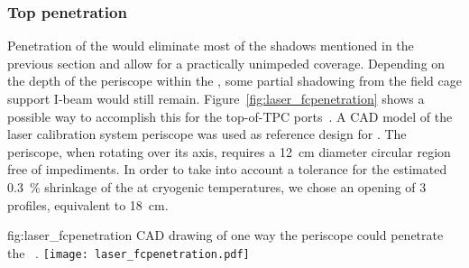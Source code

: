 \subsubsection{Top  penetration}
\label{sec:lasertopfcpen}

Penetration of the  would eliminate most of the shadows mentioned in the previous section and allow for a practically unimpeded coverage. Depending on the depth of the periscope within the , some partial shadowing from the field cage support I-beam would still remain.
Figure~\ref{fig:laser_fcpenetration} shows a possible way to accomplish this for the top-of-TPC ports~\cite{bib:yu2019a}. A CAD model of the  laser calibration system periscope was used as 
reference design for . The  periscope, when rotating over its axis, requires a \SI{12}{\cm} diameter circular region free of impediments. In order to take into account a tolerance for the estimated \SI{0.3}{\%} shrinkage of the  at cryogenic temperatures, we chose an opening of \num{3} profiles, equivalent to \SI{18}{\cm}.

\begin{dunefigure}{fig:laser_fcpenetration}
{CAD drawing of one way the periscope could penetrate the ~\cite{bib:yu2019a}.}
\texttt{[image: laser\_fcpenetration.pdf]}
\end{dunefigure}

